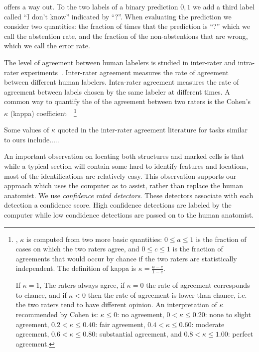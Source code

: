 \documentclass[11pt]{article}
\begin{document}
\cite{Conformal} offers a way out. To the two labels of a binary prediction
$0,1$ we add a third label called ``I don't know'' indicated by
``?''. When evaluating the prediction we consider two quantities: the
fraction of times that the prediction is ``?'' which we call the
abstention rate, and the fraction of the non-abstentions that are
wrong, which we call the error rate.


The level of agreement between human labelers is studied in
inter-rater and intra-rater experiments~\cite{}. Inter-rater agreement
measures the rate of agreement between different human
labelers. Intra-rater agreement measures the rate of agreement between
labels chosen by the same labeler at different times.  A common way to
quantify the of the agreement between two raters is the Cohen's
$\kappa$ (kappa) coefficient~\cite{mchugh2012interrater}~\footnote{ ,
  $\kappa$ is computed from two more basic quantities: $0\leq a\leq 1$ is
  the fraction of cases on which the two raters agree, and
  $0\leq c\leq 1$ is the fraction of agreements that would occur by
  chance if the two raters are statistically independent.
  The definition of kappa is $\kappa=\frac{a-c}{1-c}$.

  If $\kappa=1$, The raters always agree, if $\kappa=0$ the rate of
  agreement corresponds to chance, and if $\kappa<0$ then the rate of
  agreement is lower than chance, i.e. the two raters tend to have
  different opinion. An interpretation of $\kappa$ recommended by
  Cohen \cite{mchugh2012interrater} is: $\kappa\leq 0$: no agreement,
  $0< \kappa\leq 0.20$: none to slight agreement,
  $0.2<\kappa\leq 0.40$: fair agreement, $0.4<\kappa\leq 0.60$:
  moderate agreement, $0.6<\kappa\leq 0.80$: substantial agreement,
  and $0.8<\kappa\leq 1.00$: perfect agreement.}

Some values of $\kappa$ quoted in the inter-rater agreement literature
for tasks similar to ours include.....

  An important observation on locating both structures and marked cells
is that while a typical section will contain some hard to identify
features and locations, most of the identifications are relatively
easy. This observation supports our approach which uses the computer as
to assist, rather than replace the human anatomist. We
use {\em confidence rated detectors}. These detectors
associate with each detection a confidence score. High confidence
detections are labeled by the computer while low condidence detections
are passed on to the human anatomist.
\fi
\end{document}
